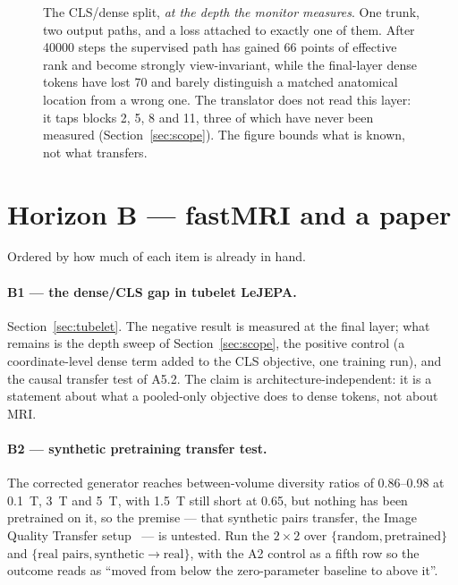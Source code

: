 \documentclass[11pt,a4paper]{article}
\begin{document}
\begin{figure}[t]
{}
  \caption{The CLS/dense split, \emph{at the depth the monitor measures}. One trunk, two output paths,
  and a loss attached to exactly one of them. After \num{40000} steps the supervised path has gained
  \num{66} points of effective rank and become strongly view-invariant, while the final-layer dense
  tokens have lost \num{70} and barely distinguish a matched anatomical location from a wrong one. The
  translator does not read this layer: it taps blocks 2, 5, 8 and 11, three of which have never been
  measured (Section~\ref{sec:scope}). The figure bounds what is known, not what transfers.}
  \label{fig:clsdense}
\end{figure}

\section{Horizon B --- fastMRI and a paper}
\label{sec:horizonB}

Ordered by how much of each item is already in hand.

\paragraph{B1 --- the dense/CLS gap in tubelet LeJEPA.} Section~\ref{sec:tubelet}. The negative result is
measured at the final layer; what remains is the depth sweep of Section~\ref{sec:scope}, the positive
control (a coordinate-level dense term added to the CLS objective, one training run), and the causal
transfer test of A5.2. The claim is architecture-independent: it is a statement about what a pooled-only
objective does to dense tokens, not about MRI.

\paragraph{B2 --- synthetic pretraining transfer test.} The corrected generator reaches between-volume
diversity ratios of \numrange{0.86}{0.98} at \SI{0.1}{\tesla}, \SI{3}{\tesla} and \SI{5}{\tesla}, with
\SI{1.5}{\tesla} still short at \num{0.65}, but nothing has been pretrained on it, so the premise ---
that synthetic pairs transfer, the Image Quality Transfer setup~\cite{alexander2017iqt} --- is untested.
Run the $2\times2$ over $\{\text{random}, \text{pretrained}\}$ and
$\{\text{real pairs}, \text{synthetic} \to \text{real}\}$, with the A2 control as a fifth row so the
outcome reads as ``moved from below the zero-parameter baseline to above it''.
\end{document}

